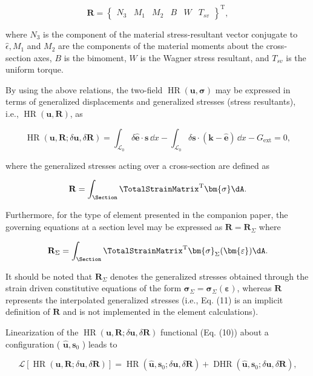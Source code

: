 $$
\mathbf{R}=\left\{\begin{array}{llllll}
N_3 & M_1 & M_2 & B & W & T_{s v}
\end{array}\right\}^{\mathrm{T}},
$$

where $N_3$ is the component of the material stress-resultant vector conjugate to $\hat{\epsilon}, M_1$ and $M_2$ are the components of the material moments about the cross-section axes, $B$ is the bimoment, $W$ is the Wagner stress resultant, and $T_{s v}$ is the uniform torque.

By using the above relations, the two-field $\operatorname{HR}(\bm{u}, \bm{\sigma})$ may be expressed in terms of generalized displacements and generalized stresses (stress resultants), i.e., $\operatorname{HR}(\bm{u}, \mathbf{R})$, as

$$
\operatorname{HR}(\bm{u}, \mathbf{R} ; \delta \bm{u}, \delta \mathbf{R})
=\int_{\mathscr{L}_0} \delta \hat{\bm{e}}\cdot \bm{s} \,\dd x
-\int_{\mathscr{L}_0} \delta \bm{s} \cdot (\mathbf{k}-\hat{\bm{e}}) \,\dd x
-G_{\mathrm{ext}}
=0,
$$

where the generalized stresses acting over a cross-section are defined as

$$
\mathbf{R}=\int_{\Section} \TotalStrainMatrix^{\mathrm{T}} \bm{\sigma} \dA .
$$


Furthermore, for the type of element presented in the companion paper, the governing equations at a section level may be expressed as $\mathbf{R}=\mathbf{R}_{\Sigma}$ where

$$
\mathbf{R}_{\Sigma}=\int_{\Section} \TotalStrainMatrix^{\mathrm{T}} \bm{\sigma}_{\Sigma}(\bm{\varepsilon}) \dA .
$$


It should be noted that $\mathbf{R}_{\Sigma}$ denotes the generalized stresses obtained through the strain driven constitutive equations of the form $\bm{\sigma}_{\Sigma}=\bm{\sigma}_{\Sigma}(\bm{\varepsilon})$, whereas $\mathbf{R}$ represents the interpolated generalized stresses (i.e., Eq. (11) is an implicit definition of $\mathbf{R}$ and is not implemented in the element calculations).

Linearization of the $\operatorname{HR}(\bm{u}, \mathbf{R} ; \delta \bm{u}, \delta \mathbf{R})$ functional (Eq. (10)) about a configuration ( $\hat{\bm{u}}, \bm{s}_0$ ) leads to

$$
\mathscr{L}[\operatorname{HR}(\bm{u}, \mathbf{R} ; \delta \bm{u}, \delta \mathbf{R})]=\operatorname{HR}(\hat{\bm{u}}, \bm{s}_0 ; \delta \bm{u}, \delta \mathbf{R})+\operatorname{DHR}(\hat{\bm{u}}, \bm{s}_0 ; \delta \bm{u}, \delta \mathbf{R}),
$$

